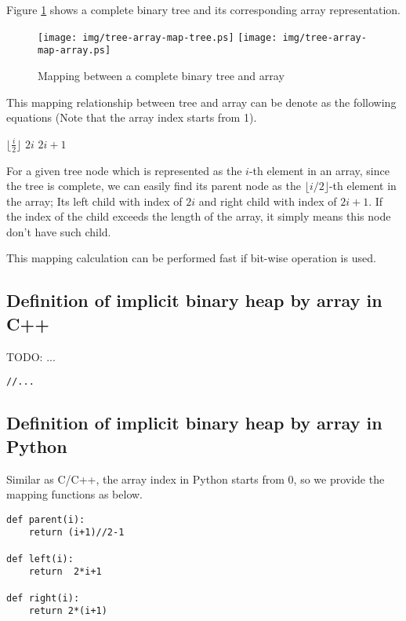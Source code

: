 \documentclass{article}
\begin{document}
Figure \ref{fig:tree-array-map} shows a complete binary tree and
its corresponding array representation.

\begin{figure}[htbp]
       \begin{center}
       	  \texttt{[image: img/tree-array-map-tree.ps]}
          \texttt{[image: img/tree-array-map-array.ps]}
        \caption{Mapping between a complete binary tree and array} \label{fig:tree-array-map}
       \end{center}
\end{figure}

This mapping relationship between tree and array can be denote as 
the following equations (Note that the array index starts from 1).

\begin{algorithmic}[1]
  \State \Return $\lfloor \frac{i}{2} \rfloor$
\EndFunction
\Statex
{}
  \State \Return $2i$
\EndFunction
\Statex
{}
  \State \Return $2i+1$
\EndFunction
\end{algorithmic}

For a given tree node which is represented as the $i$-th element in an
array, since the tree is complete, we can easily find its parent node
as the $\lfloor i/2 \rfloor$-th element in the array; Its left child
with index of $2i$ and right child with index of $2i+1$. If the index
of the child exceeds the length of the array, it simply means this 
node don't have such child.

This mapping calculation can be performed fast if bit-wise operation
is used.

\subsection*{Definition of implicit binary heap by array in C++}
TODO: ...

\lstset{language=C++}
\begin{lstlisting}
//...
\end{lstlisting}

\subsection*{Definition of implicit binary heap by array in Python}
Similar as C/C++, the array index in Python starts from 0, so we provide
the mapping functions as below.

\lstset{language=Python}
\begin{lstlisting}
def parent(i):
    return (i+1)//2-1

def left(i):
    return  2*i+1

def right(i):
    return 2*(i+1)
\end{lstlisting}
\end{document}
